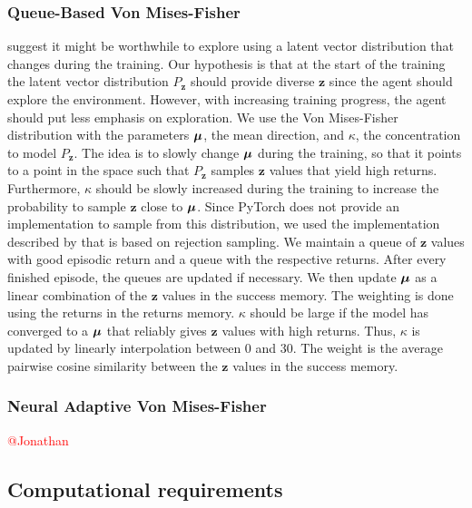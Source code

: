 \documentclass[10pt]{article} %
\begin{document}
\subsubsection{Queue-Based Von Mises-Fisher}
\cite{rle-paper} suggest it might be worthwhile to explore using a latent vector distribution that changes during the training. Our hypothesis is that at the start of the training the latent vector distribution $P_{\textbf{z}}$ should provide diverse $\textbf{z}$ since the agent should explore the environment. However, with increasing training progress, the agent should put less emphasis on exploration. We use the Von Mises-Fisher distribution with the parameters ${\bm{\mu}}$, the mean direction, and $\kappa$, the concentration to model $P_{\textbf{z}}$. The idea is to slowly change ${\bm{\mu}}$ during the training, so that it points to a point in the space such that $P_{\textbf{z}}$ samples $\mathbf{z}$ values that yield high returns. Furthermore, $\kappa$ should be slowly increased during the training to increase the probability to sample $\mathbf{z}$ close to ${\bm{\mu}}$. Since PyTorch does not provide an implementation to sample from this distribution, we used the implementation described by \cite{von-mises-fisher-paper} that is based on rejection sampling. We maintain a queue of $\textbf{z}$ values with good episodic return and a queue with the respective returns. After every finished episode, the queues are updated if necessary. We then update ${\bm{\mu}}$ as a linear combination of the $\textbf{z}$ values in the success memory. The weighting is done using the returns in the returns memory. $\kappa$ should be large if the model has converged to a ${\bm{\mu}}$ that reliably gives $\textbf{z}$ values with high returns. Thus, $\kappa$ is updated by linearly interpolation between 0 and 30. The weight is the average pairwise cosine similarity between the $\textbf{z}$ values in the success memory.


\subsubsection{Neural Adaptive Von Mises-Fisher}
\textcolor{red}{@Jonathan}


\hypertarget{computational-requirements}{\subsection{Computational requirements}}
\end{document}

